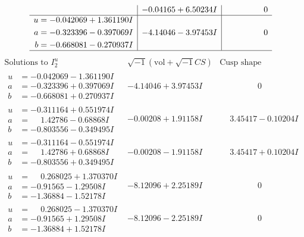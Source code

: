 \documentclass[1p]{elsarticle_modified}
\theoremstyle{definition}
\newcommand{\I}{\sqrt{-1}}
\begin{document}
$$\begin{array}{c|c|c}
 & -0.04165 + 6.50234 I & \phantom{-0.000000 } 0 \\ \hline\begin{aligned}
u &= -0.042069 + 1.361190 I \\
a &= -0.323396 - 0.397069 I \\
b &= -0.668081 - 0.270937 I\end{aligned}
 & -4.14046 - 3.97453 I & \phantom{-0.000000 } 0\\
 \hline 
 \end{array}$$\newpage$$\begin{array}{c|c|c}  
\text{Solutions to }I^u_{2}& \I (\text{vol} + \sqrt{-1}CS) & \text{Cusp shape}\\
 \hline 
\begin{aligned}
u &= -0.042069 - 1.361190 I \\
a &= -0.323396 + 0.397069 I \\
b &= -0.668081 + 0.270937 I\end{aligned}
 & -4.14046 + 3.97453 I & \phantom{-0.000000 } 0 \\ \hline\begin{aligned}
u &= -0.311164 + 0.551974 I \\
a &= \phantom{-}1.42786 - 0.68868 I \\
b &= -0.803556 - 0.349495 I\end{aligned}
 & -0.00208 + 1.91158 I & \phantom{-}3.45417 - 0.10204 I \\ \hline\begin{aligned}
u &= -0.311164 - 0.551974 I \\
a &= \phantom{-}1.42786 + 0.68868 I \\
b &= -0.803556 + 0.349495 I\end{aligned}
 & -0.00208 - 1.91158 I & \phantom{-}3.45417 + 0.10204 I \\ \hline\begin{aligned}
u &= \phantom{-}0.268025 + 1.370370 I \\
a &= -0.91565 - 1.29508 I \\
b &= -1.36884 - 1.52178 I\end{aligned}
 & -8.12096 + 2.25189 I & \phantom{-0.000000 } 0 \\ \hline\begin{aligned}
u &= \phantom{-}0.268025 - 1.370370 I \\
a &= -0.91565 + 1.29508 I \\
b &= -1.36884 + 1.52178 I\end{aligned}
 & -8.12096 - 2.25189 I & \phantom{-0.000000 } 0 \\ \hline\begin{aligned}

\end{aligned}
\end{array}$$
\end{document}
